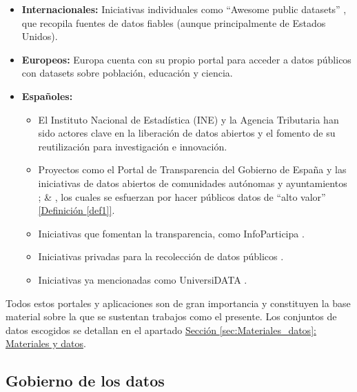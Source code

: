 	\begin{itemize}  %
		\item \textbf{Internacionales:}  
		Iniciativas individuales como ``Awesome public datasets'' \citep{awesomePublicDatasets}, que recopila fuentes de datos fiables (aunque principalmente de Estados Unidos).  
		
		\item \textbf{Europeos:}  
		Europa cuenta con su propio portal para acceder a datos públicos \citep{PortalDatosEuropa} con datasets sobre población, educación y ciencia.  
		
		\item \textbf{Españoles:}
		\begin{itemize}
			\item El Instituto Nacional de Estadística (INE) y la Agencia Tributaria han sido actores clave en la liberación de datos abiertos y el fomento de su reutilización para investigación e innovación.  
			\item Proyectos como el Portal de Transparencia del Gobierno de España y las iniciativas de datos abiertos de comunidades autónomas y ayuntamientos \citep{PortalDatosGob}; \citep{PortalDatosMadrid} \& \citep{PortalRegistradores}, los cuales se esfuerzan por hacer públicos datos de ``alto valor'' \hyperref[def1]{[Definición \ref*{def1}]}.  
			\item Iniciativas que fomentan la transparencia, como InfoParticipa \citep{PortalInfoparticipa}.  
			\item Iniciativas privadas para la recolección de datos públicos \citep{PortalEsriEspanna}.  
			\item Iniciativas ya mencionadas como UniversiDATA \citep{UniversiDATA}.  
		\end{itemize}
	\end{itemize}
	
	Todos estos portales y aplicaciones son de gran importancia y constituyen la base material sobre la que se sustentan trabajos como el presente. Los conjuntos de datos escogidos se detallan en el apartado \hyperref[sec:Materiales_datos]{Sección \ref*{sec:Materiales_datos}: Materiales y datos}. \\
	
	\subsection{Gobierno de los datos} \label{sec:EstudiosDatosGobernanza}
	
